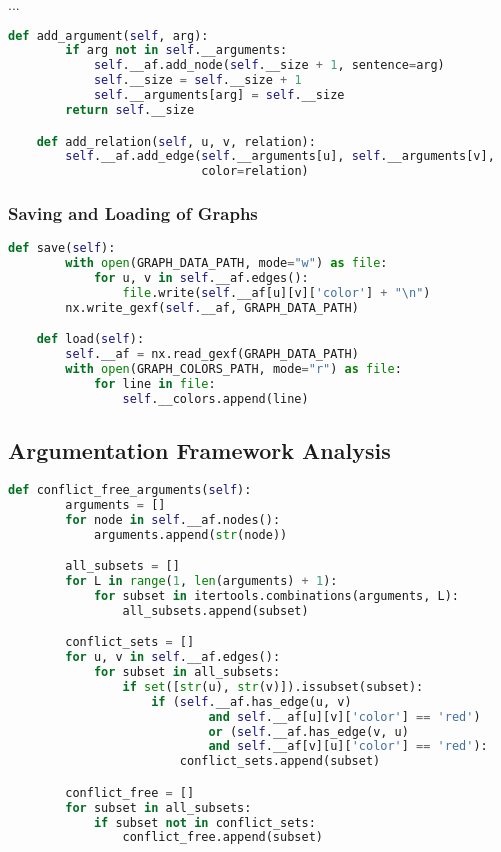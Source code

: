            ...
            
            \begin{lstlisting}[language=Python, caption=Adding Arguments and Relations, label=code:addargrelation]
    def add_argument(self, arg):
        if arg not in self.__arguments:
            self.__af.add_node(self.__size + 1, sentence=arg)
            self.__size = self.__size + 1
            self.__arguments[arg] = self.__size
        return self.__size

    def add_relation(self, u, v, relation):
        self.__af.add_edge(self.__arguments[u], self.__arguments[v], 
                           color=relation)
            \end{lstlisting}
            
            \subsubsection{Saving and Loading of Graphs}
            
                \begin{lstlisting}[language=Python, caption=Saving and Loading Argument Frameworks, label=code:afsaveload]
    def save(self):
        with open(GRAPH_DATA_PATH, mode="w") as file:
            for u, v in self.__af.edges():
                file.write(self.__af[u][v]['color'] + "\n")
        nx.write_gexf(self.__af, GRAPH_DATA_PATH)

    def load(self):
        self.__af = nx.read_gexf(GRAPH_DATA_PATH)
        with open(GRAPH_COLORS_PATH, mode="r") as file:
            for line in file:
                self.__colors.append(line)
                \end{lstlisting}
    
    \subsection{Argumentation Framework Analysis} \label{bapanalysis}
        
        \begin{lstlisting}[language=Python, caption=Conflict Free Arguments, label=code:conflictfree]
    def conflict_free_arguments(self):
        arguments = []
        for node in self.__af.nodes():
            arguments.append(str(node))

        all_subsets = []
        for L in range(1, len(arguments) + 1):
            for subset in itertools.combinations(arguments, L):
                all_subsets.append(subset)

        conflict_sets = []
        for u, v in self.__af.edges():
            for subset in all_subsets:
                if set([str(u), str(v)]).issubset(subset):
                    if (self.__af.has_edge(u, v) 
                            and self.__af[u][v]['color'] == 'red') 
                            or (self.__af.has_edge(v, u) 
                            and self.__af[v][u]['color'] == 'red'):
                        conflict_sets.append(subset)

        conflict_free = []
        for subset in all_subsets:
            if subset not in conflict_sets:
                conflict_free.append(subset)
            \end{lstlisting}
        
